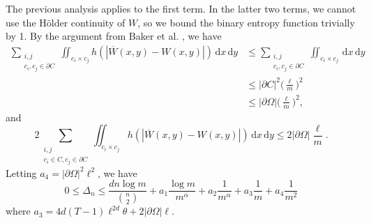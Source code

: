 \documentclass{svproc}
\newcommand{\1}{\mathbbm{1}}
\newcommand{\K}{\Omega}
\newcommand{\ol}[1]{\overline{#1}}
\newcommand{\dd}{\,\mathrm{d}}
\begin{document}
The previous analysis applies to the first term. In the latter two terms, we cannot use the H\"{o}lder continuity of $W$, so we bound the binary entropy function trivially by 1. By the argument from Baker et al. \cite{bakerpaper}, we have
\begin{align*}
\sum_{\substack{i,j\\ c_i,c_j\in\partial C}}\iint_{c_i\times c_j}h(|\ol{W}(x,y)-W(x,y)|)\dd x\dd y&\leq\sum_{\substack{i,j\\ c_i,c_j\in\partial C}}\iint_{c_i\times c_j}\dd x\dd y\\
&\leq |\partial C|^2\Big(\frac{\ell}{m}\Big)^2\\
&\leq |\partial\K|\Big(\frac{\ell}{m}\Big)^2,
\end{align*}
and
\begin{equation}
2\sum_{\substack{i,j\\ c_i\in C, c_j\in\partial C}}\iint_{c_i\times c_j}h(|\ol{W}(x,y)-W(x,y)|)\dd x\dd y\leq 2|\partial\K|\frac{\ell}{m}.
\end{equation}
Letting $a_4 = |\partial\K|^2\ell^2$, we have
\[
0\leq\Delta_n\leq\frac{dn\log m}{\binom n2} +a_1 \frac{\log m}{m^\alpha}+a_2 \frac{1}{m^\alpha}+a_3\frac{1}{m}+a_4\frac{1}{m^2}
\]
where $a_3 = 4d(T-1)\ell^{2d}\theta + 2|\partial\K|\ell$.
\end{document}
